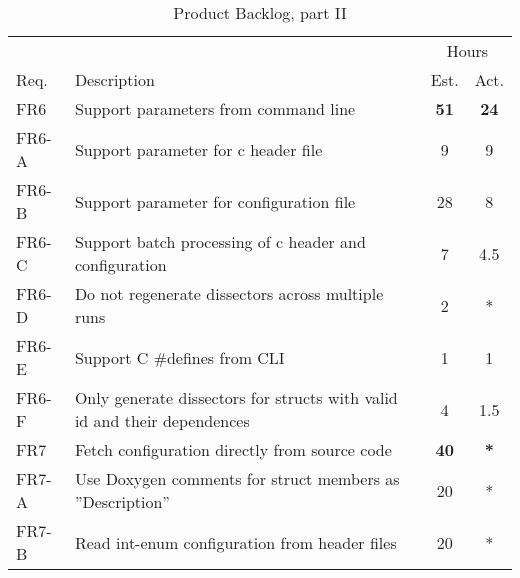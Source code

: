 \begin{table}[ht] \small \center
\caption{Product Backlog, part II \label{tab:prodbacklog2}}
\begin{tabularx}{\textwidth}{l X c c}
	\toprule
	& & \multicolumn{2}{c}{Hours} \\
	\cmidrule(r){3-4}
	Req. & Description & Est. & Act. \\
	\midrule	
	FR6 & Support parameters from command line &  \textbf{51} & \textbf{24}\\
	FR6-A & Support parameter for \Gls{c} \gls{header} file & 9 & 9 \\
	FR6-B & Support parameter for configuration file & 28 & 8 \\
	FR6-C & Support batch processing of \Gls{c} \gls{header} and configuration & 7 & 4.5 \\
	FR6-D & Do not regenerate dissectors across multiple runs & 2 & *\\
	FR6-E & Support C \#defines from CLI & 1 & 1 \\
	FR6-F & Only generate dissectors for structs with valid id and their dependences & 4 & 1.5\\
    \addlinespace
	FR7 & Fetch configuration directly from source code & \textbf{40} &  \textbf{*} \\
	FR7-A & Use Doxygen comments for struct members as ''Description'' & 20 & *\\
	FR7-B & Read int-enum configuration from header files & 20 & * \\
	\bottomrule
\end{tabularx}
\end{table}









